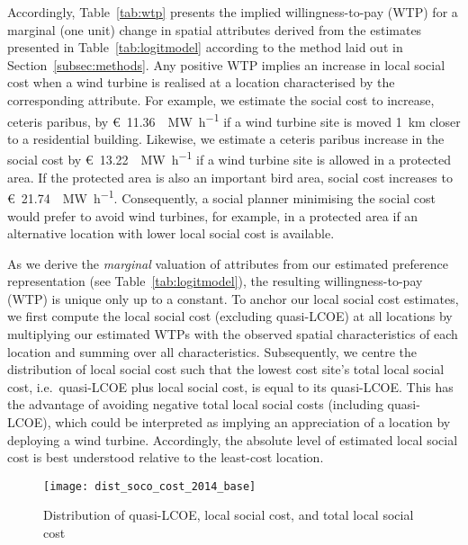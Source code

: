 \documentclass[review, a4paper, 12pt, authoryear, times]{elsarticle}
\begin{document}


Accordingly, Table~\ref{tab:wtp} presents the implied willingness-to-pay (WTP) for a marginal (one unit) change in spatial attributes derived from the estimates presented in Table~\ref{tab:logitmodel} according to the method laid out in Section~\ref{subsec:methods}.
Any positive WTP implies an increase in local social cost when a wind turbine is realised at a location characterised by the corresponding attribute. 
For example, we estimate the social cost to increase, ceteris paribus, by \SI{11.36}[\euro]{\per\mega\watt\per\hour} if a wind turbine site is moved \SI{1}{\kilo\metre} closer to a residential building.
Likewise, we estimate a ceteris paribus increase in the social cost by \SI{13.22}[\euro]{\per\mega\watt\per\hour} if a wind turbine site is allowed in a protected area. 
If the protected area is also an important bird area, social cost increases to \SI{21.74}[\euro]{\per\mega\watt\per\hour}.
Consequently, a social planner minimising the social cost would prefer to avoid wind turbines, for example, in a protected area if an alternative location with lower local social cost is available.

As we derive the \emph{marginal} valuation of attributes from our estimated preference representation (see Table~\ref{tab:logitmodel}), the resulting willingness-to-pay (WTP) is unique only up to a constant.
To anchor our local social cost estimates, we first compute the local social cost (excluding quasi-LCOE) at all locations by multiplying our estimated WTPs with the observed spatial characteristics of each location and summing over all characteristics.
Subsequently, we centre the distribution of local social cost such that the lowest cost site's total local social cost, i.e.\ quasi-LCOE plus local social cost, is equal to its quasi-LCOE.
This has the advantage of avoiding negative total local social costs (including quasi-LCOE), which could be interpreted as implying an appreciation of a location by deploying a wind turbine.
Accordingly, the absolute level of estimated local social cost is best understood relative to the least-cost location.

\begin{figure}[t]
    \centering
    \texttt{[image: dist\_soco\_cost\_2014\_base]}
    \caption{Distribution of quasi-LCOE, local social cost, and total local social cost}
    \label{fig:dist-cost}
\end{figure}
\end{document}

